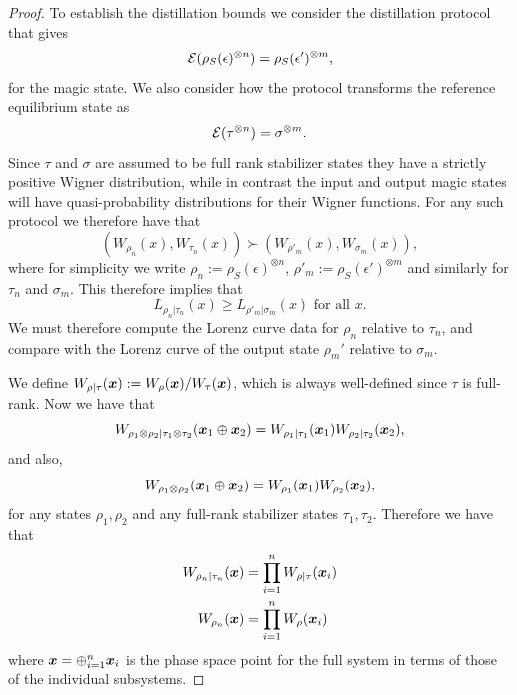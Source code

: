 \documentclass[pra,
aps,
twocolumn,
superscriptaddress,
groupedaddress,
nofootinbib,
reprint
]{revtex4-1}
\begin{document}
\begin{proof}
To establish the distillation bounds we consider the distillation protocol that gives
\begin{equation}
\mathcal{E}( \rho_S(\epsilon)^{\otimes n}) = \rho_S(\epsilon')^{\otimes m},
\end{equation}
for the magic state. We also consider how the protocol transforms the reference equilibrium state as
\begin{equation}
\mathcal{E}( \tau^{\otimes n}) = \sigma^{\otimes m}.
\end{equation}
Since $\tau$ and $\sigma$ are assumed to be full rank stabilizer states they have a strictly positive Wigner distribution, while in contrast the input and output magic states will have quasi-probability distributions for their Wigner functions. For any such protocol we therefore have that
\begin{equation}
(W_{\rho_n} (x), W_{\tau_n}(x) ) \succ  (W_{\rho'_m} (x), W_{\sigma_m}(x) ),
\end{equation}
where for simplicity we write $\rho_n := \rho_S(\epsilon)^{\otimes n}$, $\rho'_m:= \rho_S(\epsilon')^{\otimes m}$ and similarly for $\tau_n$ and $\sigma_m$. This therefore implies that
\begin{equation}
L_{\rho_n |\tau_n}(x) \ge L_{\rho'_m |\sigma_m}(x) \mbox{ for all } x.
\end{equation}
We must therefore compute the Lorenz curve data for $\rho_n$ relative to $\tau_n$, and compare with the Lorenz curve of the output state $\rho_m'$ relative to $\sigma_m$.

We define $W_{\rho | \tau}(\boldsymbol{x}) := W_\rho(\boldsymbol{x})/W_\tau(\boldsymbol{x})$, which is always well-defined since $\tau$ is full-rank. Now we have that
\begin{equation}
W_{\rho_1\otimes \rho_2 | \tau_1 \otimes \tau_2} (\boldsymbol{x}_1 \oplus \boldsymbol{x}_2) = W_{\rho_1 | \tau_1}(\boldsymbol{x}_1)W_{\rho_2 | \tau_2}(\boldsymbol{x}_2),
\end{equation}
and also,
\begin{equation}
W_{\rho_1\otimes \rho_2} (\boldsymbol{x}_1 \oplus \boldsymbol{x}_2) = W_{\rho_1}(\boldsymbol{x}_1)W_{\rho_2}(\boldsymbol{x}_2),
\end{equation}
for any states $\rho_1, \rho_2$ and any full-rank stabilizer states $\tau_1, \tau_2$. 
Therefore we have that
\begin{align}
W_{\rho_n |\tau_n} (\boldsymbol{x}) &= \prod_{i=1}^n W_{\rho|\tau}(\boldsymbol{x}_i)\\
W_{\rho_n } (\boldsymbol{x}) &= \prod_{i=1}^n W_\rho(\boldsymbol{x}_i)
\end{align}
where $\boldsymbol{x} = \oplus_{i=1}^n \boldsymbol{x}_i$ is the phase space point for the full system in terms of those of the individual subsystems.


\end{proof}
\end{document}
